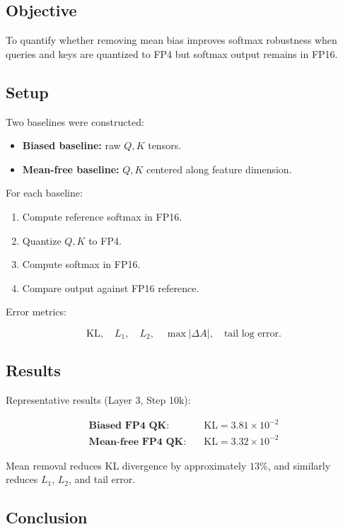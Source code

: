 \subsection{Objective}

To quantify whether removing mean bias improves softmax robustness when
queries and keys are quantized to FP4 but softmax output remains in FP16.

\subsection{Setup}

Two baselines were constructed:

\begin{itemize}
\item \textbf{Biased baseline:} raw $Q,K$ tensors.
\item \textbf{Mean-free baseline:} $Q,K$ centered along feature dimension.
\end{itemize}

For each baseline:

\begin{enumerate}
\item Compute reference softmax in FP16.
\item Quantize $Q,K$ to FP4.
\item Compute softmax in FP16.
\item Compare output against FP16 reference.
\end{enumerate}

Error metrics:

\[
\text{KL}, \quad L_1, \quad L_2, \quad \max |\Delta A|, \quad \text{tail log error}.
\]

\subsection{Results}

Representative results (Layer 3, Step 10k):

\begin{align*}
\textbf{Biased FP4 QK:} \quad & \text{KL}=3.81\times 10^{-2} \\
\textbf{Mean-free FP4 QK:} \quad & \text{KL}=3.32\times 10^{-2}
\end{align*}

Mean removal reduces KL divergence by approximately $13\%$,
and similarly reduces $L_1$, $L_2$, and tail error.

\subsection{Conclusion}

